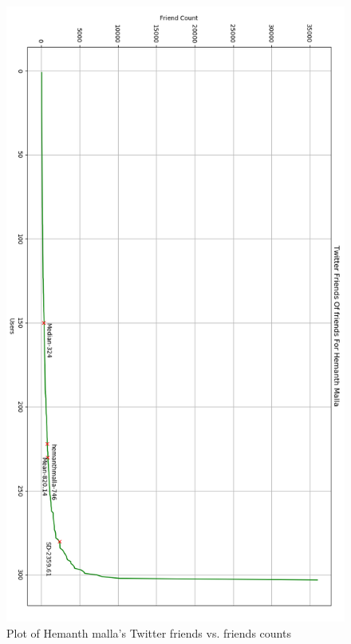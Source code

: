\documentclass[letterpaper,11pt]{article}
\begin{document}
\begin{figure}[h]
\centering
\includegraphics[width=\textwidth]{twitterFriendsParadox.png}
\caption{Plot of Hemanth malla's Twitter friends vs. friends counts}
\label{fig:q2followers}
\end{figure}



\end{document}
